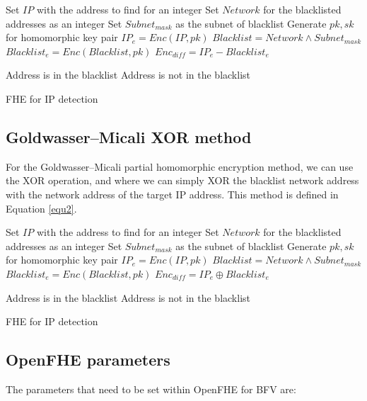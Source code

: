 \documentclass[envcountsame,runningheads,notitlepage]{llncs}
\begin{document}
\begin{algorithm}\label{equ1}
  \begin{algorithmic}[1]

\State Set $IP$ with the address to find for an integer
\State Set $Network$ for the blacklisted addresses as an integer
\State Set $Subnet_{mask}$ as the subnet of blacklist
\State Generate $pk,sk$ for homomorphic key pair
\State $IP_e=Enc(IP,pk)$
\State $Blacklist = Network \land Subnet_{mask}$
\State $Blacklist_e=Enc(Blacklist,pk)$
\State $Enc_{diff}=IP_e-Blacklist_e$

    \State Address is in the blacklist
\Else
        \State Address is not in the blacklist
\EndIf 

\caption{FHE for IP detection} 
\end{algorithmic}
\end{algorithm}

\subsection{Goldwasser–Micali XOR method}
For the Goldwasser–Micali partial homomorphic encryption method, we can use the XOR operation, and where we can simply XOR the blacklist network address with the network address of the target IP address. This method is defined in Equation \ref{equ2}.

\begin{algorithm}\label{equ2}
  \begin{algorithmic}[1]

\State Set $IP$ with the address to find for an integer
\State Set $Network$ for the blacklisted addresses as an integer
\State Set $Subnet_{mask}$ as the subnet of blacklist
\State Generate $pk,sk$ for homomorphic key pair
\State $IP_e=Enc(IP,pk)$
\State $Blacklist = Network \land Subnet_{mask}$
\State $Blacklist_e=Enc(Blacklist,pk)$
\State $Enc_{diff}=IP_e \oplus Blacklist_e$

    \State Address is in the blacklist
\Else
        \State Address is not in the blacklist
\EndIf 

\caption{FHE for IP detection} 
\end{algorithmic}
\end{algorithm}

\subsection{OpenFHE parameters}
The parameters that need to be set within OpenFHE for BFV are: 
\end{document}
